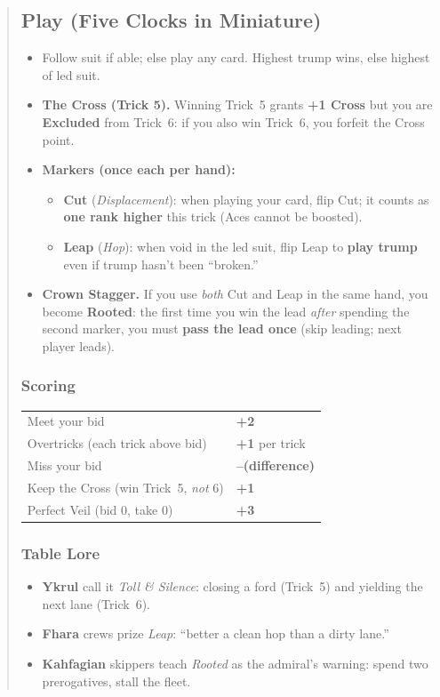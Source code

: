 \documentclass[11pt]{article}
\begin{document}
\begin{quote}
\subsection*{Play (Five Clocks in Miniature)}
\begin{itemize}[leftmargin=1.2em,itemsep=0.25em]
  \item Follow suit if able; else play any card. Highest trump wins, else highest of led suit.
  \item \textbf{The Cross (Trick 5).} Winning Trick~5 grants \textbf{+1 Cross} but you are \textbf{Excluded} from Trick~6: if you also win Trick~6, you forfeit the Cross point.
  \item \textbf{Markers (once each per hand):}
  \begin{itemize}[leftmargin=1.2em,itemsep=0.15em]
    \item \textbf{Cut} (\emph{Displacement}): when playing your card, flip Cut; it counts as \textbf{one rank higher} this trick (Aces cannot be boosted).
    \item \textbf{Leap} (\emph{Hop}): when void in the led suit, flip Leap to \textbf{play trump} even if trump hasn’t been “broken.”
  \end{itemize}
  \item \textbf{Crown Stagger.} If you use \emph{both} Cut and Leap in the same hand, you become \textbf{Rooted}: the first time you win the lead \emph{after} spending the second marker, you must \textbf{pass the lead once} (skip leading; next player leads).
\end{itemize}

\subsubsection*{Scoring}
\noindent\begin{tabularx}{\linewidth}{@{}l >{\raggedleft\arraybackslash}X@{}}
\toprule
Meet your bid & \textbf{+2} \\
Overtricks (each trick above bid) & \textbf{+1} per trick \\
Miss your bid & \textbf{–(difference)} \\
Keep the Cross (win Trick~5, \emph{not} 6) & \textbf{+1} \\
Perfect Veil (bid 0, take 0) & \textbf{+3} \\
\bottomrule
\end{tabularx}

\subsubsection*{Table Lore}
\begin{itemize}[leftmargin=1.2em,itemsep=0.25em]
  \item \textbf{Ykrul} call it \emph{Toll \& Silence}: closing a ford (Trick~5) and yielding the next lane (Trick~6).
  \item \textbf{Fhara} crews prize \emph{Leap}: “better a clean hop than a dirty lane.”
  \item \textbf{Kahfagian} skippers teach \emph{Rooted} as the admiral’s warning: spend two prerogatives, stall the fleet.
\end{itemize}


\end{quote}
\end{document}

